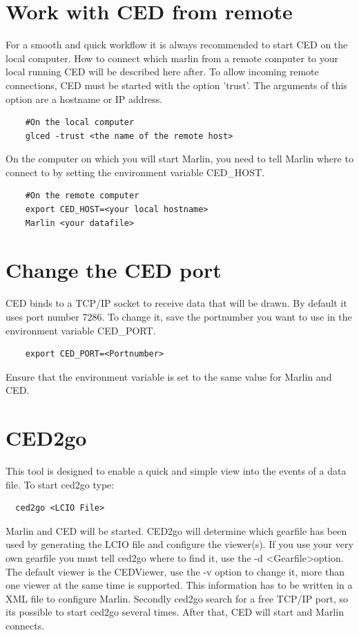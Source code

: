 \documentclass[a4paper,10pt]{article}
\begin{document}
\section{Work with CED from remote}
For a smooth and quick workflow it is always recommended to start CED on the local computer. How to connect which marlin from a remote computer to your local running CED will be described here after.
\newline\newline
To allow incoming remote connections, CED must be started with the option 'trust'. The arguments of this option are a hostname or IP address.
\begin{verbatim}
    #On the local computer
    glced -trust <the name of the remote host>
\end{verbatim}
On the computer on which you will start Marlin, you need to tell Marlin where to connect to by setting the environment variable CED\_HOST.
\begin{verbatim}
    #On the remote computer
    export CED_HOST=<your local hostname>
    Marlin <your datafile>
\end{verbatim}

\section{Change the CED port}
CED binds to a TCP/IP socket to receive data that will be drawn. By default it uses port number 7286. To change it, save the portnumber you want to use in the environment variable CED\_PORT. 
\begin{verbatim}
    export CED_PORT=<Portnumber>
\end{verbatim}
Ensure that the environment variable is set to the same value for Marlin and CED.

\section{CED2go}
This tool is designed to enable a quick and simple view into the events of a data file. To start ced2go type:
 \begin{verbatim}
  ced2go <LCIO File>
 \end{verbatim}
Marlin and CED will be started.
\newline\newline
CED2go will determine which gearfile has been used by generating the LCIO file and configure the viewer(s). If you use your very own gearfile you must tell ced2go where to find it, use the -d \textless Gearfile\textgreater   option. The default viewer is the CEDViewer, use the -v option to change it, more than one viewer at the same time is supported. This information has to be written in a XML file to configure Marlin. Secondly ced2go  search for a free TCP/IP port, so its possible to start ced2go several times. After that, CED will start and Marlin connects.
 
\end{document}
